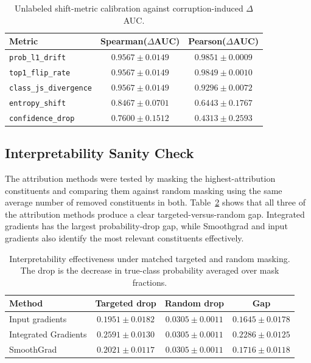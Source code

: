 \begin{table}[t]
\centering
\caption{Unlabeled shift-metric calibration against corruption-induced $\Delta$AUC.}
\label{tab:shift-calib}
\begin{tabular}{lcc}
\toprule
Metric & Spearman($\Delta$AUC) & Pearson($\Delta$AUC) \\
\midrule
\texttt{prob\_l1\_drift} & $0.9567 \pm 0.0149$ & $0.9851 \pm 0.0009$ \\
\texttt{top1\_flip\_rate} & $0.9567 \pm 0.0149$ & $0.9849 \pm 0.0010$ \\
\texttt{class\_js\_divergence} & $0.9567 \pm 0.0149$ & $0.9296 \pm 0.0072$ \\
\texttt{entropy\_shift} & $0.8467 \pm 0.0701$ & $0.6443 \pm 0.1767$ \\
\texttt{confidence\_drop} & $0.7600 \pm 0.1512$ & $0.4313 \pm 0.2593$ \\
\bottomrule
\end{tabular}
\end{table}

\subsection{Interpretability Sanity Check}

The attribution methods were tested by masking the highest-attribution constituents  and comparing them against random masking  using the same average number of removed constituents in both. Table~\ref{tab:interp-effect} shows that all three of the attribution methods produce a clear targeted-versus-random gap. Integrated gradients has the largest probability-drop gap, while Smoothgrad and input gradients also identify the most relevant constituents effectively. 

\begin{table}[t]
\centering
\caption{Interpretability effectiveness under matched targeted and random masking. The drop is the decrease in true-class probability averaged over mask fractions.}
\label{tab:interp-effect}
\begin{tabular}{lccc}
\toprule
Method & Targeted drop & Random drop & Gap \\
\midrule
Input gradients & $0.1951 \pm 0.0182$ & $0.0305 \pm 0.0011$ & $0.1645 \pm 0.0178$ \\
Integrated Gradients & $0.2591 \pm 0.0130$ & $0.0305 \pm 0.0011$ & $0.2286 \pm 0.0125$ \\
SmoothGrad & $0.2021 \pm 0.0117$ & $0.0305 \pm 0.0011$ & $0.1716 \pm 0.0118$ \\
\bottomrule
\end{tabular}
\end{table}

